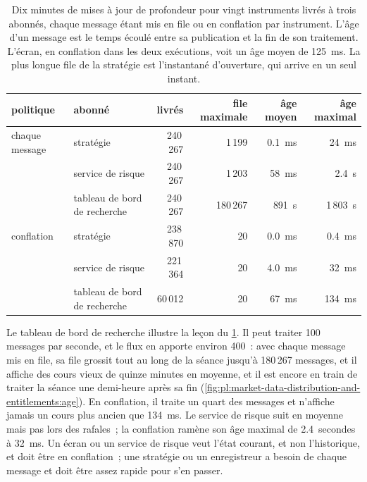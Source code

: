 \label{lst:pl:market-data-distribution-and-entitlements:queue}

\begin{table}[htbp]
\centering\small
\begin{tabular}{llrrrr}
\toprule
politique & abonné & livrés & file maximale & âge moyen & âge maximal\\
\midrule
chaque message & stratégie & 240\,267 & 1\,199 & 0.1~ms & 24~ms\\
 & service de risque & 240\,267 & 1\,203 & 58~ms & 2.4~s\\
 & tableau de bord de recherche & 240\,267 & 180\,267 & 891~s & 1\,803~s\\
conflation & stratégie & 238\,870 & 20 & 0.0~ms & 0.4~ms\\
 & service de risque & 221\,364 & 20 & 4.0~ms & 32~ms\\
 & tableau de bord de recherche & 60\,012 & 20 & 67~ms & 134~ms\\
\bottomrule
\end{tabular}
\caption{Dix minutes de mises à jour de profondeur pour vingt instruments livrés à trois abonnés, chaque message étant mis en file ou en conflation par
instrument. L'âge d'un message est le temps écoulé entre sa publication et la fin de son traitement. L'écran, en conflation dans les deux exécutions, voit un
âge moyen de 125~ms. La plus longue file de la stratégie est l'instantané d'ouverture, qui arrive en un seul instant.}
\label{tab:pl:market-data-distribution-and-entitlements:policies}
\end{table}

Le tableau de bord de recherche illustre la leçon du \cref{tab:pl:market-data-distribution-and-entitlements:policies}. Il peut traiter 100 messages par
seconde, et le flux en apporte environ 400~: avec chaque message mis en file, sa file grossit tout au long de la séance jusqu'à 180\,267 messages, et il affiche des cours
vieux de quinze minutes en moyenne, et il est encore en train de traiter la séance une demi-heure après sa fin
(\cref{fig:pl:market-data-distribution-and-entitlements:age}). En conflation, il traite un quart des messages et n'affiche jamais un cours
plus ancien que 134~ms. Le service de risque suit en moyenne mais pas lors des rafales~; la conflation ramène son âge maximal de 2.4~secondes à 32~ms. Un
écran ou un service de risque veut l'état courant, et non l'historique, et doit être en conflation~; une stratégie ou un enregistreur a besoin de chaque message
et doit être assez rapide pour s'en passer.

